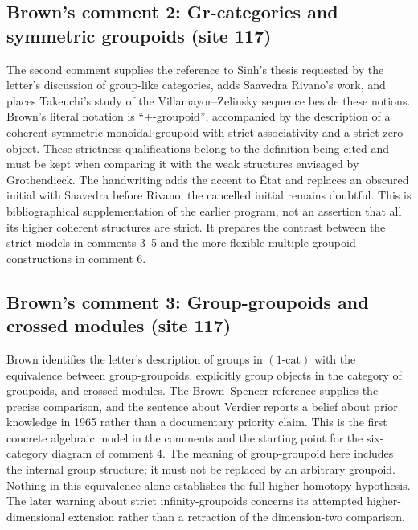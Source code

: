 \documentclass[10pt,oneside]{book}
\begin{document}
\subsection*{Brown's comment 2: Gr-categories and symmetric groupoids (site 117)}
The second comment supplies the reference to Sinh's thesis requested by the letter's discussion of group-like categories, adds Saavedra Rivano's work, and places Takeuchi's study of the Villamayor--Zelinsky sequence beside these notions. Brown's literal notation is ``+-groupoid'', accompanied by the description of a coherent symmetric monoidal groupoid with strict associativity and a strict zero object. These strictness qualifications belong to the definition being cited and must be kept when comparing it with the weak structures envisaged by Grothendieck. The handwriting adds the accent to État and replaces an obscured initial with Saavedra before Rivano; the cancelled initial remains doubtful. This is bibliographical supplementation of the earlier program, not an assertion that all its higher coherent structures are strict. It prepares the contrast between the strict models in comments 3--5 and the more flexible multiple-groupoid constructions in comment 6.

\subsection*{Brown's comment 3: Group-groupoids and crossed modules (site 117)}
Brown identifies the letter's description of groups in $(1\text{-cat})$ with the equivalence between group-groupoids, explicitly group objects in the category of groupoids, and crossed modules. The Brown--Spencer reference supplies the precise comparison, and the sentence about Verdier reports a belief about prior knowledge in 1965 rather than a documentary priority claim. This is the first concrete algebraic model in the comments and the starting point for the six-category diagram of comment 4. The meaning of group-groupoid here includes the internal group structure; it must not be replaced by an arbitrary groupoid. Nothing in this equivalence alone establishes the full higher homotopy hypothesis. The later warning about strict infinity-groupoids concerns its attempted higher-dimensional extension rather than a retraction of the dimension-two comparison.
\end{document}
